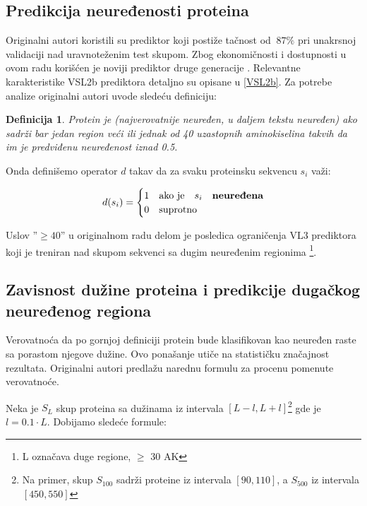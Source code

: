 \subsection{Predikcija neuređenosti proteina}
\label{naredno}

Originalni autori koristili su  prediktor koji
postiže tačnost od $~87\%$ pri unakrsnoj validaciji nad uravnoteženim test
skupom.  Zbog ekonomičnosti i dostupnosti u ovom radu korišćen je noviji
prediktor druge generacije .
Relevantne karakteristike VSL2b prediktora detaljno su opisane u \ref{VSL2b}.
Za potrebe analize originalni autori  uvode sledeću definiciju:

\newtheorem{mydef}{Definicija}
\begin{mydef}
\label{pdis_def}
Protein je  (najverovatnije neuređen, u daljem tekstu neuređen) 
ako sadrži bar jedan region veći ili jednak od 40 uzastopnih aminokiselina
takvih da im je predviđenu neuređenost iznad 0.5. 
\end{mydef}

Onda definišemo operator $d$ takav da za svaku proteinsku sekvencu $s_i$ važi:

\[   
  d(s_i) = 
    \begin{cases}
      1 & \text{ako je} \quad s_i \quad \textbf{neuređena}\\
      0 & \text{suprotno}
    \end{cases}
\]

Uslov ''$\ge40$'' u originalnom radu delom je posledica ograničenja VL3
prediktora koji je treniran nad skupom sekvenci sa dugim neuređenim regionima
\footnote{L označava duge regione, $\ge$ 30 AK}.

\subsection{Zavisnost dužine proteina i predikcije dugačkog neuređenog regiona}

Verovatnoća da po gornjoj definiciji protein bude klasifikovan kao neuređen
raste sa porastom njegove dužine. Ovo ponašanje  utiče na statističku
značajnost rezultata.  Originalni autori predlažu narednu formulu za procenu
pomenute verovatnoće.

Neka je $S_L$ skup proteina sa dužinama iz intervala $[L-l, L+l]$\footnote{Na
primer, skup $S_{100}$ sadrži proteine iz intervala $[90, 110]$, a $S_{500}$ iz
intervala $[450, 550]$} gde je $l = 0.1 \cdot L$. Dobijamo sledeće formule:

